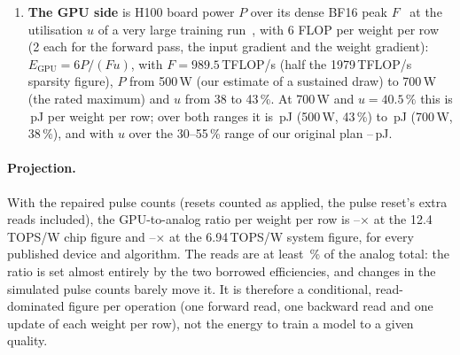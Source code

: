 \begin{enumerate}
      Attention products, nonlinearities, normalisation, activation storage, data movement, control, reference maintenance and
      static power are not modelled on either side, and the digital exclusions do not cancel the analog ones. The rest of the TT family's digital work, called the
      digital TT state below (the storage of $H$, AGAD's averages $p$ and $p^{\mathrm{ref}}$ and their arithmetic, the chopper
      signs, the threshold tests and the transfer scheduling), is outside the ratio.
\item \textbf{The GPU side} is H100 board power $P$ over its dense BF16 peak $F$~\cite{nvidiah100} at the utilisation $u$ of
      a very large training run~\cite{dubey2024}, with 6 FLOP per weight per row (2 each for the forward pass, the input
      gradient and the weight gradient): $E_{\mathrm{GPU}}=6P/(Fu)$, with $F=989.5$\,TFLOP/s (half the 1979\,TFLOP/s
      sparsity figure), $P$ from 500\,W (our estimate of a sustained draw) to 700\,W (the rated maximum) and $u$ from 38 to
      43\,\%. At 700\,W and $u=40.5\,\%$ this is \RVenGpuPj\,pJ per weight per row; over both ranges it is
      \RVenGpuMeasLo\,pJ (500\,W, 43\,\%) to \RVenGpuMeasHi\,pJ (700\,W, 38\,\%), and with $u$ over the 30--55\,\% range of our
      original plan \RVenGpuPlannedLo--\RVenGpuPlannedHi\,pJ.
\end{enumerate}

\paragraph{Projection.} With the repaired pulse counts (resets counted as applied, the pulse reset's extra reads included), the
GPU-to-analog ratio per weight per row is \RVenChipMin--\RVenChipMax$\times$ at the 12.4\,TOPS/W chip figure and
\RVenSysMin--\RVenSysMax$\times$ at the 6.94\,TOPS/W system figure, for every published device and algorithm. The reads are at
least \RVenChipMvmShareMin\,\% of the analog total: the ratio is set almost entirely by the two borrowed efficiencies, and changes in the simulated pulse counts barely move it. It is therefore a conditional, read-dominated figure per
operation (one forward read, one backward read and one update of each weight per row), not the energy to train a model to a
given quality.


